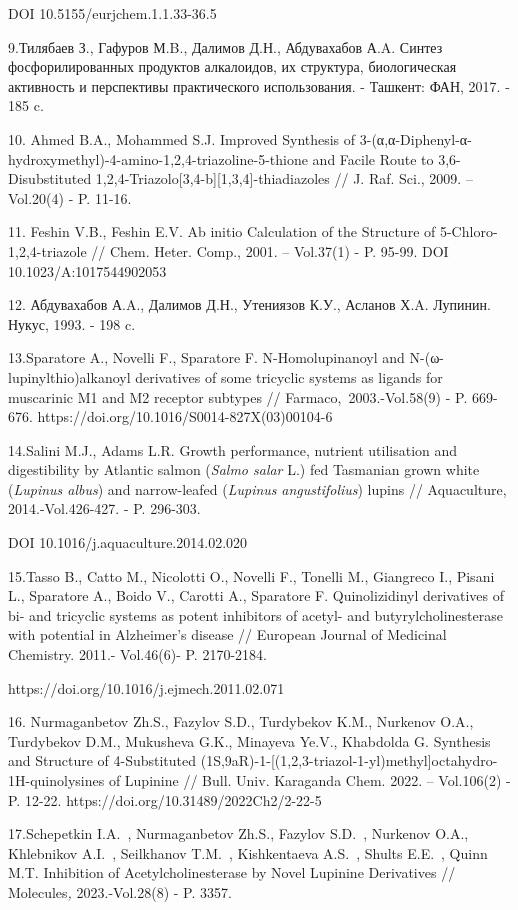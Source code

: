 DOI 10.5155/eurjchem.1.1.33-36.5

9.Тилябаев З., Гафуров М.B., Далимов Д.Н., Абдувахабов А.A. Синтез
фосфорилированных продуктов алкалоидов, их структура, биологическая
активность и перспективы практического использования. - Ташкент: ФАН,
2017. - 185 c.

10. Ahmed B.A., Mohammed S.J. Improved Synthesis of
3-(α,α-Diphenyl-α-hydroxymethyl)-4-amino-1,2,4-triazoline-5-thione and
Facile Route to 3,6-Disubstituted
1,2,4-Triazolo{[}3,4-b{]}{[}1,3,4{]}-thiadiazoles // J. Raf. Sci., 2009.
-- Vol.20(4) - P. 11-16.

11. Feshin V.B., Feshin E.V. Ab initio Calculation of the Structure of
5-Chloro-1,2,4-triazole // Chem. Heter. Comp., 2001. -- Vol.37(1) - P.
95-99. DOI 10.1023/A:1017544902053

12. Абдувахабов А.A., Далимов Д.Н., Утениязов К.У., Асланов Х.A.
Лупинин. Нукус, 1993. - 198 c.

13.Sparatore A., Novelli F., Sparatore F. N-Homolupinanoyl and
N-(ω-lupinylthio)alkanoyl derivatives of some tricyclic systems as
ligands for muscarinic M1 and M2 receptor subtypes //
Farmaco,~2003.-Vol.58(9) - P. 669-676.
https://doi.org/10.1016/S0014-827X(03)00104-6

14.Salini M.J., Adams L.R. Growth performance, nutrient utilisation and
digestibility by Atlantic salmon (\emph{Salmo salar} L.) fed Tasmanian
grown white (\emph{Lupinus albus}) and narrow-leafed (\emph{Lupinus}
\emph{angustifolius}) lupins // Aquaculture, 2014.-Vol.426-427. - P.
296-303.

DOI 10.1016/j.aquaculture.2014.02.020

15.Tasso B., Catto M., Nicolotti O., Novelli F., Tonelli M., Giangreco
I., Pisani L., Sparatore A., Boido V., Carotti A., Sparatore F.
Quinolizidinyl derivatives of bi- and tricyclic systems as potent
inhibitors of acetyl- and butyrylcholinesterase with potential in
Alzheimer's disease // European Journal of Medicinal Chemistry. 2011.-
Vol.46(6)- P. 2170-2184.

https://doi.org/10.1016/j.ejmech.2011.02.071

16. Nurmaganbetov Zh.S., Fazylov S.D., Turdybekov K.M., Nurkenov O.A.,
Turdybekov D.M., Mukusheva G.K., Minayeva Ye.V., Khabdolda G. Synthesis
and Structure of 4-Substituted
(1S,9aR)-1-{[}(1,2,3-triazol-1-yl)methyl{]}octahydro-1H-quinolysines of
Lupinine // Bull. Univ. Karaganda Chem. 2022. -- Vol.106(2) - P. 12-22.
https://doi.org/10.31489/2022Ch2/2-22-5

17.Schepetkin I.A.~, Nurmaganbetov Zh.S., Fazylov S.D.~, Nurkenov O.A.,
Khlebnikov A.I.~, Seilkhanov T.M.~, Kishkentaeva A.S.~, Shults E.E.~,
Quinn M.T. Inhibition of Acetylcholinesterase by Novel Lupinine
Derivatives // Molecules\emph{,} 2023.-Vol.28(8) - P. 3357.

